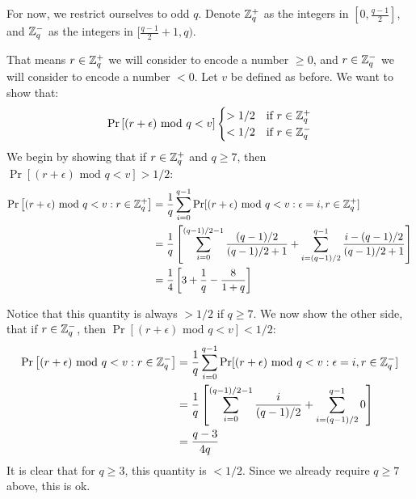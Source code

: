 \documentclass[11pt]{article}
\begin{document}
 For now, we
restrict ourselves to odd $q$. Denote ${\mathbb Z}_q^+$ as the integers in $[0,
\frac{q-1}{2}]$, and ${\mathbb Z}_q^-$ as the integers in $[\frac{q-1}{2}+1, q)$.

That means $r \in {\mathbb Z}_q^+$ we will consider to encode a number $\geq 0$, and
$r \in {\mathbb Z}_q^-$ we will consider to encode a number $< 0$. Let $v$ be defined
as before. We want to show that:
\begin{align*}
    \Pr\left[ (r+\epsilon) \text{ mod } q < v\right]
    \begin{cases}
        > 1/2 & \mbox{if } r\in{\mathbb Z}_q^+  \\
        < 1/2 & \mbox{if } r\in{\mathbb Z}_q^-
    \end{cases}
\end{align*}
We begin by showing that if $r \in {\mathbb Z}_q^+$ and $q \geq 7$, then
$\Pr\left[(r+\epsilon)\text{ mod }q<v\right] > 1/2$:
\begin{align*}
    \Pr\left[(r+\epsilon)\text{ mod }q<v : r \in {\mathbb Z}_q^+ \right] &=
        \frac{1}{q}\sum\limits_{i=0}^{q-1}\Pr[(r+\epsilon)\text{ mod }q<v : \epsilon=i, r\in {\mathbb Z}_q^+ ] \\
        &= \frac{1}{q}\left[ \sum\limits_{i=0}^{(q-1)/2-1} \frac{(q-1)/2}{(q-1)/2+1} + \sum\limits_{i=(q-1)/2}^{q-1} \frac{i-(q-1)/2}{(q-1)/2+1} \right] \\
        &= \frac{1}{4}\left[3+\frac{1}{q}-\frac{8}{1+q}\right]
\end{align*}



Notice that this quantity is always $> 1/2$ if $q \geq 7$. We now show the other side, that
if $r \in {\mathbb Z}_q^-$, then $\Pr\left[(r+\epsilon)\text{ mod }q<v\right] < 1/2$:
\begin{align*}
    \Pr\left[(r+\epsilon)\text{ mod }q<v:r\in{\mathbb Z}_q^-\right] &=
        \frac{1}{q}\sum\limits_{i=0}^{q-1}\Pr[(r+\epsilon)\text{ mod }q<v : \epsilon=i,r\in{\mathbb Z}_q^-] \\
        &= \frac{1}{q}\left[ \sum\limits_{i=0}^{(q-1)/2-1} \frac{i}{(q-1)/2} + \sum\limits_{i=(q-1)/2}^{q-1} 0 \right] \\
        &= \frac{q-3}{4q}
\end{align*}
It is clear that for $q \geq 3$, this quantity is $< 1/2$. Since we already
require $q \geq 7$ above, this is ok.
\end{document}
